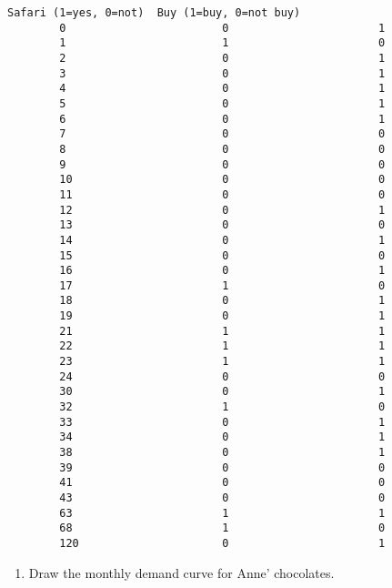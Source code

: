 \documentclass[11pt]{article}
\providecommand{\tightlist}{%
      \setlength{\itemsep}{0pt}\setlength{\parskip}{0pt}}
\begin{document}
\begin{Verbatim}[commandchars=\\\{\}]
             Safari (1=yes, 0=not)  Buy (1=buy, 0=not buy)  
        0                        0                       1  
        1                        1                       0  
        2                        0                       1  
        3                        0                       1  
        4                        0                       1  
        5                        0                       1  
        6                        0                       1  
        7                        0                       0  
        8                        0                       0  
        9                        0                       0  
        10                       0                       0  
        11                       0                       0  
        12                       0                       1  
        13                       0                       0  
        14                       0                       1  
        15                       0                       0  
        16                       0                       1  
        17                       1                       0  
        18                       0                       1  
        19                       0                       1  
        21                       1                       1  
        22                       1                       1  
        23                       1                       1  
        24                       0                       0  
        30                       0                       1  
        32                       1                       0  
        33                       0                       1  
        34                       0                       1  
        38                       0                       1  
        39                       0                       0  
        41                       0                       0  
        43                       0                       0  
        63                       1                       1  
        68                       1                       0  
        120                      0                       1  
\end{Verbatim}
            
    \begin{enumerate}
\def\labelenumi{\arabic{enumi})}
\tightlist
\item
  Draw the monthly demand curve for Anne' chocolates.
\end{enumerate}
\end{document}
